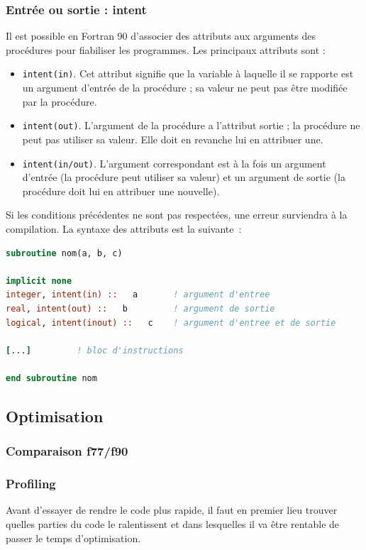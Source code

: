 \documentclass[a4paper,twoside]{article}
\begin{document}
\subsubsection{Entrée ou sortie : intent}

Il est possible en Fortran 90 d'associer des attributs aux arguments des procédures pour fiabiliser les programmes. Les principaux attributs sont : 
\begin{itemize}
\item  \texttt{intent(in)}. Cet attribut signifie que la variable à laquelle il se rapporte est un argument d'entrée de la procédure ; sa valeur ne peut pas être modifiée par la procédure. 

\item  \texttt{intent(out)}. L'argument de la procédure a l'attribut sortie ; la procédure ne peut pas utiliser sa valeur. Elle doit en revanche lui en attribuer une.

\item  \texttt{intent(in/out)}. L'argument correspondant est à la fois un argument d'entrée (la procédure peut utiliser sa valeur) et un argument de sortie (la procédure doit lui en attribuer une nouvelle). 
\end{itemize}
Si les conditions précédentes ne sont pas respectées, une erreur surviendra à la compilation. La syntaxe des attributs est la suivante~: 
\begin{lstlisting}[language=Fortran]
subroutine nom(a, b, c)
 
implicit none         
integer, intent(in) ::   a       ! argument d'entree 
real, intent(out) ::   b         ! argument de sortie 
logical, intent(inout) ::   c    ! argument d'entree et de sortie
 
[...]         ! bloc d'instructions
 
end subroutine nom 
\end{lstlisting}


\subsection{Optimisation}
\subsubsection{Comparaison f77/f90}
\subsubsection{Profiling}
Avant d'essayer de rendre le code plus rapide, il faut en premier lieu trouver quelles parties du code le ralentissent et dans lesquelles il va être rentable de passer le temps d'optimisation.
\end{document}
